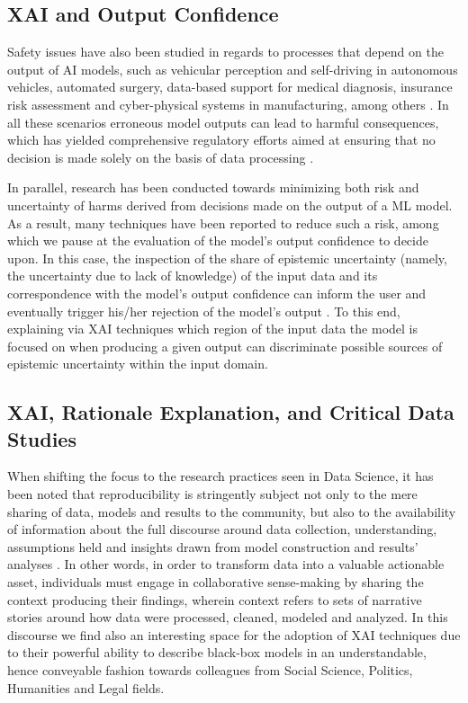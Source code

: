 \documentclass[final]{elsarticle}
\begin{document}
\subsection{XAI and Output Confidence} \label{ssec:output_confidence}

Safety issues have also been studied in regards to processes that depend on the output of AI models, such as vehicular perception and self-driving in autonomous vehicles, automated surgery, data-based support for medical diagnosis, insurance risk assessment and cyber-physical systems in manufacturing, among others \cite{varshney2017safety}. In all these scenarios erroneous model outputs can lead to harmful consequences, which has yielded comprehensive regulatory efforts aimed at ensuring that no decision is made solely on the basis of data processing \cite{goodman2017Fair}. 

In parallel, research has been conducted towards minimizing both risk and uncertainty of harms derived from decisions made on the output of a ML model. As a result, many techniques have been reported to reduce such a risk, among which we pause at the evaluation of the model's output confidence to decide upon. In this case, the inspection of the share of epistemic uncertainty (namely, the uncertainty due to lack of knowledge) of the input data and its correspondence with the model's output confidence can inform the user and eventually trigger his/her rejection of the model's output \cite{weiss2004mining,attenberg2015beat}. To this end, explaining via XAI techniques which region of the input data the model is focused on when producing a given output can discriminate possible sources of epistemic uncertainty within the input domain.

\subsection{{\color{black}XAI, Rationale Explanation, and Critical Data Studies}} \label{ssec:critical_data}

When shifting the focus to the research practices seen in Data Science, it has been noted that reproducibility is stringently subject not only to the mere sharing of data, models and results to the community, but also to the availability of information about the full discourse around data collection, understanding, assumptions held and insights drawn from model construction and results' analyses \cite{neff2017critique}. In other words, in order to transform data into a valuable actionable asset, individuals must engage in collaborative sense-making by sharing the context producing their findings, wherein context refers to sets of narrative stories around how data were processed, cleaned, modeled and analyzed. In this discourse we find also an interesting space for the adoption of XAI techniques due to their powerful ability to describe black-box models in an understandable, hence conveyable fashion towards colleagues from Social Science, Politics, Humanities and Legal fields. 
\end{document}
